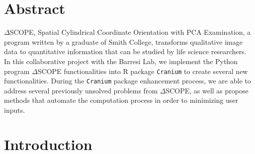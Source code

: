 \documentclass[10pt,letterpaper]{article}
\newcommand{\getIndex}[2]{
  \ForEach{,}{\IfEq{#1}{\thislevelitem}{\number\thislevelcount\ExitForEach}{}}{#2}
}
\newcommand{\getAff}[1]{
  \getIndex{#1}{}
}
\begin{document}
\vspace*{0.2in}

\section*{Abstract}
\(\Delta\)SCOPE, Spatial Cylindrical Coordinate Orientation with PCA
Examination, a program written by a graduate of Smith College,
transforms qualitative image data to quantitative information that can
be studied by life science researchers. In this collaborative project
with the Barresi Lab, we implement the Python program \(\Delta\)SCOPE
functionalities into R package \texttt{Cranium} to create several new
functionalities. During the \texttt{Cranium} package enhancement
process, we are able to address several previously unsolved problems
from \(\Delta\)SCOPE, as well as propose methods that automate the
computation process in order to minimizing user inputs.


\linenumbers

\hypertarget{introduction}{%
\section{Introduction}\label{introduction}}
\end{document}
